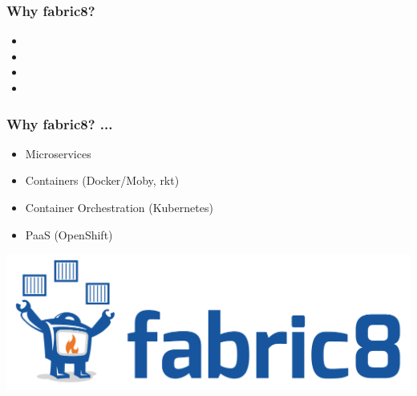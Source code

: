 \documentclass[aspectratio=169]{beamer}
\begin{document}
\begin{frame}
  \frametitle{Why fabric8?}

  \begin{itemize}
  \item<1-> 

  \item<2-> 

  \item<3-> 

  \item<4-> 

  \end{itemize}

\end{frame}

\begin{frame}
  \frametitle{Why fabric8? ...}

  \begin{itemize}
  \item<1-> Microservices
  \item<2-> Containers (Docker/Moby, rkt)
  \item<3-> Container Orchestration (Kubernetes)
  \item<4-> PaaS (OpenShift)
  \end{itemize}

\end{frame}

\begin{frame}
  \includegraphics[scale=.4]{images/fabric8_logo.png}
\end{frame}
\end{document}
